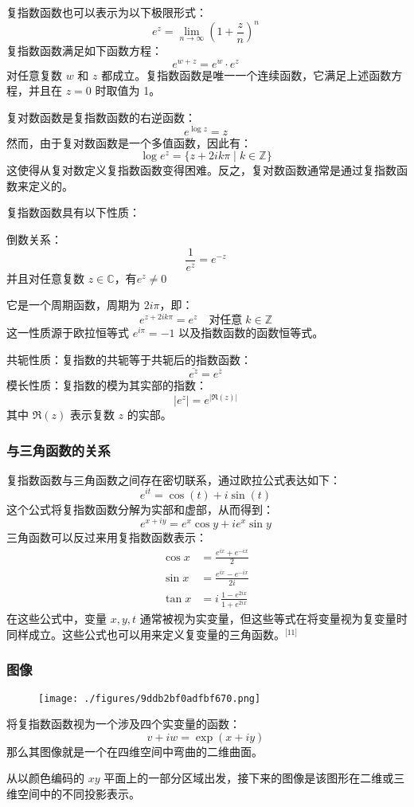 复指数函数也可以表示为以下极限形式：
$$
e^z = \lim_{n \to \infty} \left(1 + \frac{z}{n} \right)^n~
$$
复指数函数满足如下函数方程：
$$
e^{w + z} = e^w \cdot e^z~
$$
对任意复数 $w$ 和 $z$ 都成立。复指数函数是唯一一个连续函数，它满足上述函数方程，并且在 $z = 0$ 时取值为 1。

复对数函数是复指数函数的右逆函数：
$$
e^{\log z} = z~
$$
然而，由于复对数函数是一个多值函数，因此有：
$$
\log e^z = \{ z + 2ik\pi \mid k \in \mathbb{Z} \}~
$$
这使得从复对数定义复指数函数变得困难。反之，复对数函数通常是通过复指数函数来定义的。

复指数函数具有以下性质：

倒数关系：
  $$
  \frac{1}{e^z} = e^{-z}~
  $$
并且对任意复数 $z \in \mathbb{C}$，有$e^z \neq 0$

它是一个周期函数，周期为 $2i\pi$，即：
  $$
  e^{z + 2ik\pi} = e^z \quad \text{对任意} \; k \in \mathbb{Z}~
  $$
这一性质源于欧拉恒等式 $e^{i\pi} = -1$ 以及指数函数的函数恒等式。

共轭性质：复指数的共轭等于共轭后的指数函数：
  $$
  \overline{e^z} = e^{\overline{z}}~
  $$
模长性质：复指数的模为其实部的指数：
  $$
  |e^z| = e^{|\Re(z)|}~
  $$
其中 $\Re(z)$ 表示复数 $z$ 的实部。
\subsubsection{与三角函数的关系}
复指数函数与三角函数之间存在密切联系，通过欧拉公式表达如下：
$$
e^{it} = \cos(t) + i\sin(t)~
$$
这个公式将复指数函数分解为实部和虚部，从而得到：
$$
e^{x + i y} = e^x \cos y + i e^x \sin y~
$$
三角函数可以反过来用复指数函数表示：
$$
\begin{aligned}
\cos x &= \frac{e^{ix} + e^{-ix}}{2} \\
\sin x &= \frac{e^{ix} - e^{-ix}}{2i} \\
\tan x &= i\,\frac{1 - e^{2ix}}{1 + e^{2ix}}
\end{aligned}~
$$
在这些公式中，变量 $x, y, t$ 通常被视为实变量，但这些等式在将变量视为复变量时同样成立。这些公式也可以用来定义复变量的三角函数。\(^\text{[11]}\)
\subsubsection{图像}
\begin{figure}[ht]
\centering
\texttt{[image: ./figures/9ddb2bf0adfbf670.png]}
\caption{} \label{fig_ZShs_6}
\end{figure}
将复指数函数视为一个涉及四个实变量的函数：
$$
v + iw = \exp(x + iy)~
$$
那么其图像就是一个在四维空间中弯曲的二维曲面。

从以颜色编码的 $xy$ 平面上的一部分区域出发，接下来的图像是该图形在二维或三维空间中的不同投影表示。

